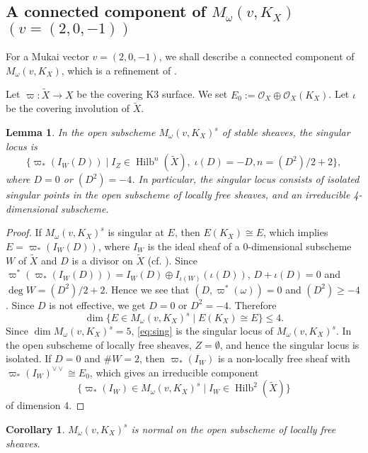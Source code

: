 \documentclass[leqno,11pt]{amsart}
\def\deg{\mathop{\mathrm{deg}}}
\def\dim{\mathop{\mathrm{dim}}\nolimits}
\def\Hilb{\mathop{\mathrm{Hilb}}\nolimits}
\newtheorem{Lem}[Thm]{Lemma}
\newtheorem{Cor}[Thm]{Corollary}
\theoremstyle{definition}
\def\OO{\ensuremath{\mathcal O}}
\begin{document}
\subsection{A connected component of $M_\omega(v,K_X)$ $(v=(2,0,-1))$}



For a Mukai vector $v=(2,0,-1)$, we shall describe a connected component
of $M_\omega(v,K_X)$, which is a refinement of \cite[Remark 2.3]{Yos16a}.

 
Let $\varpi:\widetilde{X} \to X$ be the covering K3 surface.
We set $E_0:=\OO_X \oplus \OO_X(K_X)$.
Let $\iota$ be the covering involution of $\widetilde{X}$.
\begin{Lem}\label{lem:ext^2}
In the open subscheme $M_\omega(v,K_X)^s$ of stable sheaves,
the singular locus is 
\begin{equation}\label{eq:sing}
\{ \varpi_*(I_W(D)) \mid I_Z \in \Hilb^n(\widetilde{X}),\;\iota(D)=-D, n=(D^2)/2+2 \},
\end{equation}
where $D=0$ or $(D^2)=-4$.
In particular, the singular locus consists of isolated singular points in 
the open subscheme of locally free sheaves, and 
an irreducible 4-dimensional subscheme. 
\end{Lem}

\begin{proof}
If $M_\omega(v,K_X)^s$ is singular at $E$, then 
$E(K_X) \cong E$, which implies $E= \varpi_*(I_W(D))$, where 
$I_W$ is the ideal sheaf of a 0-dimensional subscheme $W$ of  $\widetilde{X}$
and $D$ is a divisor on $\widetilde{X}$ (cf. \cite[Lem. 2.13]{Yamada}). 
Since $\varpi^*(\varpi_*(I_W(D)))=I_W(D) \oplus I_{\iota(W)}(\iota(D))$,
$D+\iota(D)=0$ and $\deg W=(D^2)/2+2$.
Hence we see that $(D,\varpi^*(\omega))=0$ and $(D^2) \geq -4$.
Since $D$ is not effective,
we get $D=0$ or $D^2=-4$. 
Therefore 
$$
\dim \{E \in M_\omega(v,K_X)^s \mid E(K_X) \cong E \} \leq 4.
$$
Since $\dim M_\omega(v,K_X)^s=5$,  \eqref{eq:sing} is the singular locus
of $M_\omega(v,K_X)^s$.
In the open subscheme of locally free sheaves,
$Z= \emptyset$, and hence
the singular locus is isolated.
If $D=0$ and $\# W=2$, then 
$\varpi_*(I_W)$ is a non-locally free sheaf
with $\varpi_*(I_W)^{\vee \vee} \cong E_0$,
which gives an irreducible component 
$$
\{ \varpi_*(I_W) \in M_\omega(v,K_X)^s \mid I_W \in \Hilb^2(\widetilde{X}) \}
$$
of dimension 4. 
\end{proof}

\begin{Cor}
$M_\omega(v,K_X)^s$ is normal on the open subscheme of locally free
sheaves.
\end{Cor}
\end{document}
